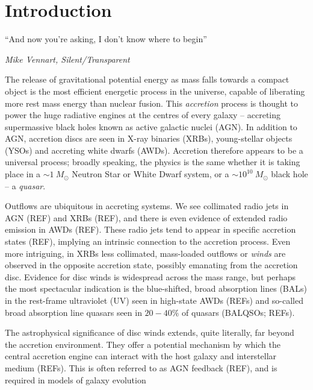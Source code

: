 \chapter{Introduction}

\epigraph{``And now you're asking, I don't know where to begin''}{{\sl Mike Vennart, Silent/Transparent}}
%

The release of gravitational potential energy as mass falls towards
a compact object is the most efficient energetic process in the universe,
capable of liberating more rest mass energy than nuclear fusion.
This {\em accretion} process is thought to power the huge radiative engines at the 
centres of every galaxy -- accreting supermassive black holes known as active galactic nuclei (AGN). 
In addition to AGN, accretion discs are seen in X-ray binaries (XRBs), young-stellar objects (YSOs) and
accreting white dwarfs (AWDs). Accretion therefore appears to be a universal process; broadly speaking, the physics is the same whether it is taking place in a $\sim1~M_\odot$ Neutron Star or White Dwarf 
system, or a $\sim10^{10}~M_\odot$ black hole -- a {\em quasar}.

Outflows are ubiquitous in accreting systems. We see collimated radio jets in AGN (REF) and
XRBs (REF), and there is even evidence of extended radio emission in AWDs (REF). These radio jets
tend to appear in specific accretion states (REF), implying an intrinsic connection to the 
accretion process. Even more intriguing, in XRBs less collimated, mass-loaded outflows
or {\em winds} are observed in the opposite accretion state, possibly emanating from the accretion disc.
Evidence for disc winds is widespread across the mass range, but perhaps the most spectacular indication
is the blue-shifted, broad absorption lines (BALs) in the rest-frame ultraviolet (UV)
seen in high-state AWDs (REFs) and so-called broad absorption line quasars seen in $20-40\%$
of quasars (BALQSOs; REFs). 

The astrophysical significance of disc winds extends, quite literally, 
far beyond the accretion environment. They offer a potential mechanism by which the central
accretion engine can interact with the host galaxy and interstellar medium (REFs). 
This is often referred to as AGN feedback (REF), and is required in models of 
galaxy evolution

